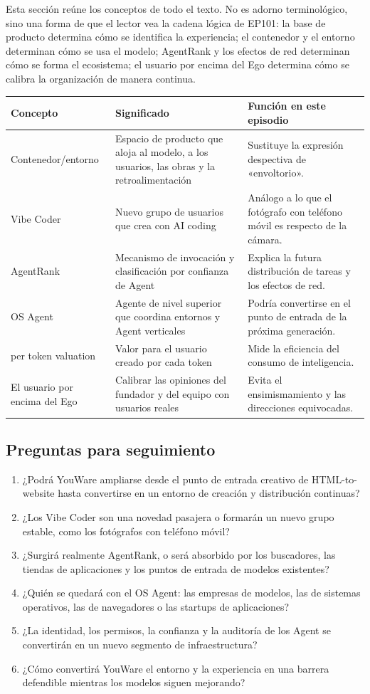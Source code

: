 \documentclass[a4paper]{article}
\begin{document}
Esta sección reúne los conceptos de todo el texto. No es adorno terminológico, sino una forma de que el lector vea la cadena lógica de EP101: la base de producto determina cómo se identifica la experiencia; el contenedor y el entorno determinan cómo se usa el modelo; AgentRank y los efectos de red determinan cómo se forma el ecosistema; el usuario por encima del Ego determina cómo se calibra la organización de manera continua.

\noindent\begin{tabularx}{\textwidth}{p{}p{}X}
\toprule
Concepto & Significado & Función en este episodio \\
\midrule
Contenedor/entorno & Espacio de producto que aloja al modelo, a los usuarios, las obras y la retroalimentación & Sustituye la expresión despectiva de «envoltorio». \\
Vibe Coder & Nuevo grupo de usuarios que crea con AI coding & Análogo a lo que el fotógrafo con teléfono móvil es respecto de la cámara. \\
AgentRank & Mecanismo de invocación y clasificación por confianza de Agent & Explica la futura distribución de tareas y los efectos de red. \\
OS Agent & Agente de nivel superior que coordina entornos y Agent verticales & Podría convertirse en el punto de entrada de la próxima generación. \\
per token valuation & Valor para el usuario creado por cada token & Mide la eficiencia del consumo de inteligencia. \\
El usuario por encima del Ego & Calibrar las opiniones del fundador y del equipo con usuarios reales & Evita el ensimismamiento y las direcciones equivocadas. \\
\bottomrule
\end{tabularx}

\subsection{Preguntas para seguimiento}

\begin{enumerate}
\item ¿Podrá YouWare ampliarse desde el punto de entrada creativo de HTML-to-website hasta convertirse en un entorno de creación y distribución continuas?
\item ¿Los Vibe Coder son una novedad pasajera o formarán un nuevo grupo estable, como los fotógrafos con teléfono móvil?
\item ¿Surgirá realmente AgentRank, o será absorbido por los buscadores, las tiendas de aplicaciones y los puntos de entrada de modelos existentes?
\item ¿Quién se quedará con el OS Agent: las empresas de modelos, las de sistemas operativos, las de navegadores o las startups de aplicaciones?
\item ¿La identidad, los permisos, la confianza y la auditoría de los Agent se convertirán en un nuevo segmento de infraestructura?
\item ¿Cómo convertirá YouWare el entorno y la experiencia en una barrera defendible mientras los modelos siguen mejorando?
\end{enumerate}
\end{document}
